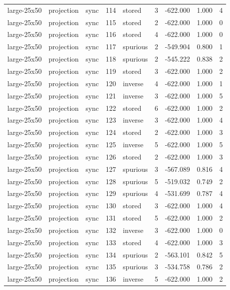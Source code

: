 \begin{tabular}{lllrlrrrr}
large-25x50 & projection & sync & 114 & stored & 3 & -622.000 & 1.000 & 4 \\
large-25x50 & projection & sync & 115 & stored & 2 & -622.000 & 1.000 & 0 \\
large-25x50 & projection & sync & 116 & stored & 4 & -622.000 & 1.000 & 0 \\
large-25x50 & projection & sync & 117 & spurious & 2 & -549.904 & 0.800 & 1 \\
large-25x50 & projection & sync & 118 & spurious & 2 & -545.222 & 0.838 & 2 \\
large-25x50 & projection & sync & 119 & stored & 3 & -622.000 & 1.000 & 2 \\
large-25x50 & projection & sync & 120 & inverse & 4 & -622.000 & 1.000 & 1 \\
large-25x50 & projection & sync & 121 & inverse & 3 & -622.000 & 1.000 & 5 \\
large-25x50 & projection & sync & 122 & stored & 6 & -622.000 & 1.000 & 2 \\
large-25x50 & projection & sync & 123 & inverse & 3 & -622.000 & 1.000 & 4 \\
large-25x50 & projection & sync & 124 & stored & 2 & -622.000 & 1.000 & 3 \\
large-25x50 & projection & sync & 125 & inverse & 5 & -622.000 & 1.000 & 5 \\
large-25x50 & projection & sync & 126 & stored & 2 & -622.000 & 1.000 & 3 \\
large-25x50 & projection & sync & 127 & spurious & 3 & -567.089 & 0.816 & 4 \\
large-25x50 & projection & sync & 128 & spurious & 5 & -519.032 & 0.749 & 2 \\
large-25x50 & projection & sync & 129 & spurious & 4 & -531.699 & 0.787 & 4 \\
large-25x50 & projection & sync & 130 & stored & 3 & -622.000 & 1.000 & 4 \\
large-25x50 & projection & sync & 131 & stored & 5 & -622.000 & 1.000 & 2 \\
large-25x50 & projection & sync & 132 & inverse & 3 & -622.000 & 1.000 & 0 \\
large-25x50 & projection & sync & 133 & stored & 4 & -622.000 & 1.000 & 3 \\
large-25x50 & projection & sync & 134 & spurious & 2 & -563.101 & 0.842 & 5 \\
large-25x50 & projection & sync & 135 & spurious & 3 & -534.758 & 0.786 & 2 \\
large-25x50 & projection & sync & 136 & inverse & 5 & -622.000 & 1.000 & 2 \\

\end{tabular}
